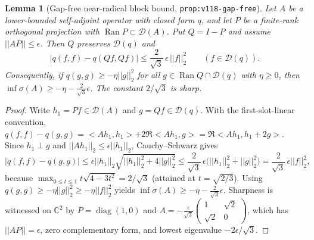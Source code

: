 \documentclass[11pt]{article}
\def\norm#1{||#1||}%
\def\ip#1#2{<#1,#2>}%
\newtheorem{lemma}[theorem]{Lemma}
\theoremstyle{remark}
\newcommand{\norm}[1]{\left\lVert #1\right\rVert}
\newcommand{\ip}[2]{\left\langle #1,#2\right\rangle}
\begin{document}
\begin{lemma}[Gap-free near-radical block bound, \texttt{prop:v118-gap-free}]
\label{lem:v118-gap-free}
Let $A$ be a lower-bounded self-adjoint operator with closed form $q$, and let $P$ be a finite-rank orthogonal projection with $\operatorname{Ran} P \subset \mathcal{D}(A)$. Put $Q = I - P$ and assume $\norm{AP} \le \epsilon$. Then $Q$ preserves $\mathcal{D}(q)$ and
\begin{equation}\label{eq:v118-gap-free-difference}
  \bigl|q(f,f) - q(Qf, Qf)\bigr| \le \frac{2}{\sqrt{3}}\,\epsilon\,\norm{f}_2^2 \qquad (f \in \mathcal{D}(q)).
\end{equation}
Consequently, if $q(g,g) \ge -\eta\norm{g}_2^2$ for all $g \in \operatorname{Ran} Q \cap \mathcal{D}(q)$ with $\eta \ge 0$, then $\inf\sigma(A) \ge -\eta - \frac{2}{\sqrt{3}}\epsilon$. The constant $2/\sqrt{3}$ is sharp.
\end{lemma}
\begin{proof}
Write $h_1 = Pf \in \mathcal{D}(A)$ and $g = Qf \in \mathcal{D}(q)$. With the first-slot-linear convention, $q(f,f) - q(g,g) = \ip{Ah_1}{h_1} + 2\Re\ip{Ah_1}{g} = \Re\ip{Ah_1}{h_1 + 2g}$. Since $h_1 \perp g$ and $\norm{Ah_1}_2 \le \epsilon\norm{h_1}_2$, Cauchy--Schwarz gives
\[
  \bigl|q(f,f) - q(g,g)\bigr| \le \epsilon\norm{h_1}_2\sqrt{\norm{h_1}_2^2 + 4\norm{g}_2^2} \le \frac{2}{\sqrt{3}}\,\epsilon\bigl(\norm{h_1}_2^2 + \norm{g}_2^2\bigr) = \frac{2}{\sqrt{3}}\,\epsilon\norm{f}_2^2,
\]
because $\max_{0 \le t \le 1} t\sqrt{4 - 3t^2} = 2/\sqrt{3}$ (attained at $t = \sqrt{2/3}$). Using $q(g,g) \ge -\eta\norm{g}_2^2 \ge -\eta\norm{f}_2^2$ yields $\inf\sigma(A) \ge -\eta - \frac{2}{\sqrt{3}}\epsilon$. Sharpness is witnessed on $\mathbb{C}^2$ by $P = \operatorname{diag}(1,0)$ and $A = -\frac{\epsilon}{\sqrt{3}}\left(\begin{smallmatrix} 1 & \sqrt{2} \\ \sqrt{2} & 0 \end{smallmatrix}\right)$, which has $\norm{AP} = \epsilon$, zero complementary form, and lowest eigenvalue $-2\epsilon/\sqrt{3}$.
\end{proof}
\end{document}

